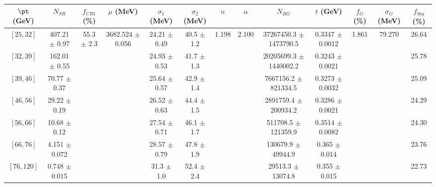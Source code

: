\begin{tabular}{c||c|c|c|c|c|c|c|c|c|c|c||c}
$\pt$ (GeV) & $N_{SR}$ & $f_{CB1}$ (\%) & $\mu$ (MeV) & $\sigma_1$ (MeV) & $\sigma_2$ (MeV) & $n$ & $\alpha$ & $N_{BG}$ & $t$ (GeV) & $f_G$ (\%) & $\sigma_G$ (MeV) & $f_{bkg}$ (\%) \\
\hline
$[25, 32]$ & 407.21 $\pm$ 0.97 & \multirow{7}{*}{55.3 $\pm$ 2.3} & \multirow{7}{*}{3682.524 $\pm$ 0.056} & 24.21 $\pm$ 0.49 & 40.5 $\pm$ 1.2 & \multirow{7}{*}{1.198} & \multirow{7}{*}{2.100} & 37267450.3 $\pm$ 1473790.5 & 0.3347 $\pm$ 0.0012 & \multirow{7}{*}{1.861} & \multirow{7}{*}{79.270} & 26.64\\
$[32, 39]$ & 162.01 $\pm$ 0.55 &  &  & 24.93 $\pm$ 0.53 & 41.7 $\pm$ 1.3 &  &  & 20205699.3 $\pm$ 1440002.2 & 0.3243 $\pm$ 0.0021 &  &  & 25.78\\
$[39, 46]$ & 70.77 $\pm$ 0.37 &  &  & 25.64 $\pm$ 0.57 & 42.9 $\pm$ 1.4 &  &  & 7667156.2 $\pm$ 821334.5 & 0.3273 $\pm$ 0.0032 &  &  & 25.09\\
$[46, 56]$ & 29.22 $\pm$ 0.19 &  &  & 26.52 $\pm$ 0.63 & 44.4 $\pm$ 1.5 &  &  & 2891759.4 $\pm$ 200934.2 & 0.3286 $\pm$ 0.0021 &  &  & 24.29\\
$[56, 66]$ & 10.68 $\pm$ 0.12 &  &  & 27.54 $\pm$ 0.71 & 46.1 $\pm$ 1.7 &  &  & 511708.5 $\pm$ 121359.9 & 0.3514 $\pm$ 0.0082 &  &  & 24.30\\
$[66, 76]$ & 4.151 $\pm$ 0.072 &  &  & 28.57 $\pm$ 0.79 & 47.8 $\pm$ 1.9 &  &  & 130679.9 $\pm$ 49944.9 & 0.365 $\pm$ 0.014 &  &  & 23.76\\
$[76, 120]$ & 0.748 $\pm$ 0.015 &  &  & 31.3 $\pm$ 1.0 & 52.4 $\pm$ 2.4 &  &  & 29513.3 $\pm$ 13074.8 & 0.355 $\pm$ 0.015 &  &  & 22.73\\
\end{tabular}
